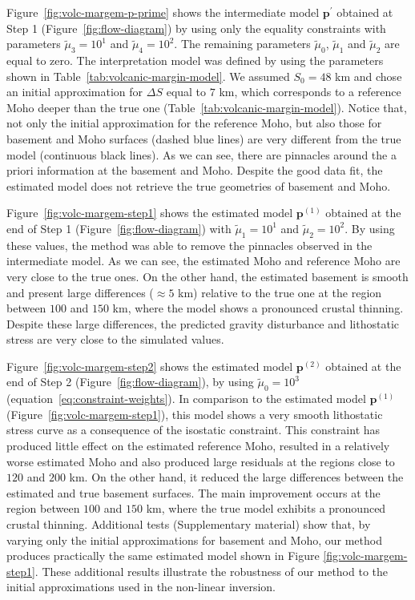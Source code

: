 \documentclass[manuscript,revised]{geophysics}
\begin{document}
Figure~\ref{fig:volc-margem-p-prime} shows the intermediate model 
$\mathbf{p}^{\prime}$ obtained at Step 1 (Figure~\ref{fig:flow-diagram})
by using only the equality constraints with parameters
$\tilde{\mu}_{3} = 10^{1}$ and $\tilde{\mu}_{4} = 10^{2}$.
The remaining parameters $\tilde{\mu}_{0}$, $\tilde{\mu}_{1}$ and
$\tilde{\mu}_{2}$ are equal to zero.
The interpretation model was defined by using the parameters shown in
Table~\ref{tab:volcanic-margin-model}.
We assumed $S_{0} = 48$ km and chose an initial approximation for $\Delta S$
equal to $7$ km, which corresponds to a reference Moho deeper 
than the true one (Table~\ref{tab:volcanic-margin-model}).
Notice that, not only the initial approximation for the reference Moho,
but also those for basement and Moho surfaces 
(dashed blue lines) are very different from
the true model (continuous black lines).
As we can see, there are pinnacles around the a priori information at the 
basement and Moho.
Despite the good data fit, the estimated model does not retrieve the true geometries 
of basement and Moho.

Figure~\ref{fig:volc-margem-step1} shows the estimated model $\mathbf{p}^{(1)}$ 
obtained at the end of Step 1 (Figure~\ref{fig:flow-diagram}) with
$\tilde{\mu}_{1} = 10^{1}$ and $\tilde{\mu}_{2} = 10^{2}$.
By using these values, the method was able to remove the pinnacles observed in
the intermediate model.
As we can see, the estimated Moho and reference Moho are very close to the true ones.
On the other hand, the estimated basement is smooth and present large differences
($\approx 5$ km) relative to the true one at the region between $100$ and $150$ km,
where the model shows a pronounced crustal thinning.
Despite these large differences, 
the predicted gravity disturbance and lithostatic stress 
are very close to the simulated values.

Figure~\ref{fig:volc-margem-step2} shows the estimated model $\mathbf{p}^{(2)}$ 
obtained at the end of Step 2 (Figure~\ref{fig:flow-diagram}), 
by using $\tilde{\mu}_{0} = 10^{3}$ (equation~\ref{eq:constraint-weights}).
In comparison to the estimated model $\mathbf{p}^{(1)}$ (Figure~\ref{fig:volc-margem-step1}),
this model shows a very smooth lithostatic stress curve as a consequence of the
isostatic constraint. This constraint has produced little effect on the
estimated reference Moho, resulted in a relatively worse estimated Moho and
also produced large residuals at the regions close to $120$ and $200$ km.
On the other hand, it reduced the large differences between the estimated and 
true basement surfaces. The main improvement occurs at the region between  
$100$ and $150$ km, where the true model exhibits a 
pronounced crustal thinning. Additional tests (Supplementary material)
show that, by varying only the initial approximations for basement and Moho,
our method produces practically the same estimated model shown in Figure
\ref{fig:volc-margem-step1}. These additional results illustrate the robustness 
of our method to the initial approximations used in the non-linear inversion.
\end{document}
